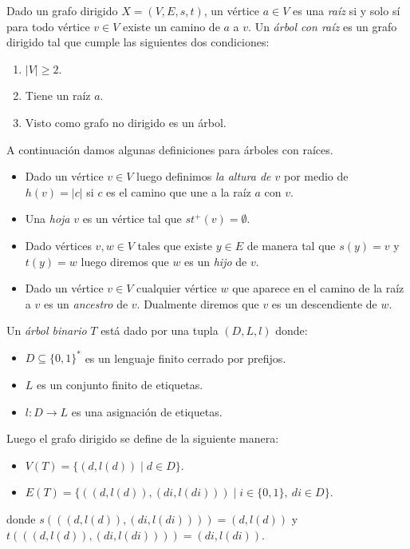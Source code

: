 \documentclass[tesis.tex]{subfiles}
\begin{document}
\begin{leoenv}
\begin{deff}
	Dado un grafo dirigido $X = (V,E,s,t)$, un vértice $a \in V$ es una \emph{raíz} si y solo sí para todo vértice $v \in V$ existe un camino de $a$ a $v$.
	Un \emph{árbol con raíz} es un grafo dirigido tal que cumple las siguientes dos condiciones:
	\begin{enumerate}
		\item $|V| \ge 2$.
		\item Tiene un raíz $a$.
		\item Visto como grafo no dirigido es un árbol.
	\end{enumerate}
	A continuación damos algunas definiciones para árboles con raíces.
	\begin{itemize}
		\item Dado un vértice $v \in V$ luego definimos \emph{la altura de $v$} por medio de 
		$h(v) = |c|$ si $c$ es el camino que une a la raíz $a$ con $v$.

		\item Una \emph{hoja} $v$ es un vértice tal que $st^{+}(v) = \emptyset$.
		
		\item Dado vértices $v,w \in V$ tales que existe $y \in E$ de manera tal que 
		$s(y) = v$ y $t(y) = w$ luego diremos que $w$ es un \emph{hijo} de $v$.

		\item Dado un vértice $v \in V$ cualquier vértice $w$ que aparece en el camino de la raíz a $v$ es un \emph{ancestro} de $v$. 
		Dualmente diremos que $v$ es un descendiente de $w$.

	\end{itemize}
\end{deff}


\begin{deff}
	Un \emph{árbol binario} $T$ está dado por una tupla $(D,L,l)$ donde:
	\begin{itemize}
		\item $D \subseteq \{0,1\}^{*}$ es un lenguaje finito cerrado por prefijos.
		\item $L$ es un conjunto finito de etiquetas.
		\item $l:D \to L$ es una asignación de etiquetas.
	\end{itemize}
	Luego el grafo dirigido se define de la siguiente manera:
	\begin{itemize}
		\item $V(T) = \{(d,l(d)) \mid d \in D \}$.
		\item $E(T) = \{ ((d,l(d)),(di,l(di))) \mid i \in \{0,1\}, \ di \in D \}$.
	\end{itemize}
	donde $s(((d,l(d)),(di,l(di)))) = (d,l(d))$ y $t(((d,l(d)),(di,l(di)))) = (di,l(di))$.
\end{deff}


\end{leoenv}
\end{document}
